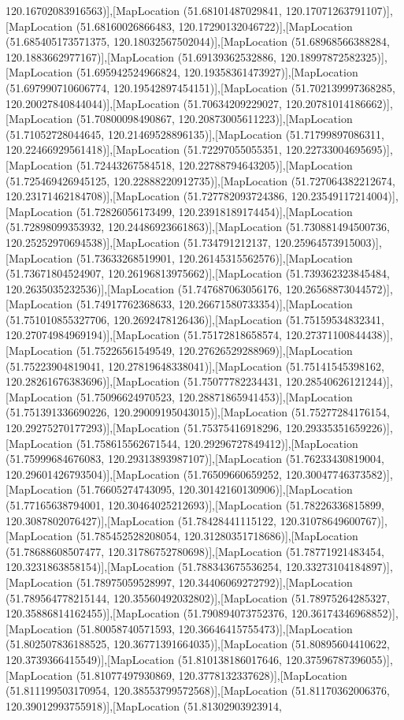 120.16702083916563)],[MapLocation (51.68101487029841, 120.17071263791107)],[MapLocation (51.68160026866483, 120.17290132046722)],[MapLocation (51.685405173571375, 120.18032567502044)],[MapLocation (51.68968566388284, 120.1883662977167)],[MapLocation (51.69139362532886, 120.18997872582325)],[MapLocation (51.695942524966824, 120.19358361473927)],[MapLocation (51.697990710606774, 120.19542897454151)],[MapLocation (51.702139997368285, 120.20027840844044)],[MapLocation (51.70634209229027, 120.20781014186662)],[MapLocation (51.70800098490867, 120.20873005611223)],[MapLocation (51.71052728044645, 120.21469528896135)],[MapLocation (51.71799897086311, 120.22466929561418)],[MapLocation (51.72297055055351, 120.22733004695695)],[MapLocation (51.72443267584518, 120.22788794643205)],[MapLocation (51.725469426945125, 120.22888220912735)],[MapLocation (51.727064382212674, 120.23171462184708)],[MapLocation (51.727782093724386, 120.23549117214004)],[MapLocation (51.72826056173499, 120.23918189174454)],[MapLocation (51.72898099353932, 120.24486923661863)],[MapLocation (51.730881494500736, 120.25252970694538)],[MapLocation (51.734791212137, 120.25964573915003)],[MapLocation (51.73633268519901, 120.26145315562576)],[MapLocation (51.73671804524907, 120.26196813975662)],[MapLocation (51.739362323845484, 120.2635035232536)],[MapLocation (51.747687063056176, 120.26568873044572)],[MapLocation (51.74917762368633, 120.26671580733354)],[MapLocation (51.751010855327706, 120.2692478126436)],[MapLocation (51.75159534832341, 120.27074984969194)],[MapLocation (51.75172818658574, 120.27371100844438)],[MapLocation (51.75226561549549, 120.27626529288969)],[MapLocation (51.75223904819041, 120.27819648338041)],[MapLocation (51.75141545398162, 120.28261676383696)],[MapLocation (51.75077782234431, 120.28540626121244)],[MapLocation (51.75096624970523, 120.28871865941453)],[MapLocation (51.751391336690226, 120.29009195043015)],[MapLocation (51.75277284176154, 120.29275270177293)],[MapLocation (51.75375416918296, 120.29335351659226)],[MapLocation (51.758615562671544, 120.29296727849412)],[MapLocation (51.75999684676083, 120.29313893987107)],[MapLocation (51.76233430819004, 120.29601426793504)],[MapLocation (51.76509660659252, 120.30047746373582)],[MapLocation (51.76605274743095, 120.30142160130906)],[MapLocation (51.77165638794001, 120.30464025212693)],[MapLocation (51.78226336815899, 120.3087802076427)],[MapLocation (51.78428441115122, 120.31078649600767)],[MapLocation (51.785452528208054, 120.31280351718686)],[MapLocation (51.78688608507477, 120.31786752780698)],[MapLocation (51.78771921483454, 120.3231863858154)],[MapLocation (51.788343675536254, 120.33273104184897)],[MapLocation (51.78975059528997, 120.34406069272792)],[MapLocation (51.789564778215144, 120.35560492032802)],[MapLocation (51.78975264285327, 120.35886814162455)],[MapLocation (51.790894073752376, 120.36174346968852)],[MapLocation (51.80058740571593, 120.36646415755473)],[MapLocation (51.802507836188525, 120.36771391664035)],[MapLocation (51.80895604410622, 120.3739366415549)],[MapLocation (51.810138186017646, 120.37596787396055)],[MapLocation (51.81077497930869, 120.3778132337628)],[MapLocation (51.811199503170954, 120.38553799572568)],[MapLocation (51.81170362006376, 120.39012993755918)],[MapLocation (51.81302903923914, 